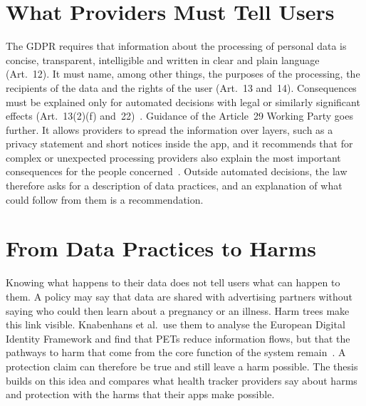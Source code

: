 \section{What Providers Must Tell Users}
\label{sec:transparency}
The GDPR requires that information about the processing of personal data is
concise, transparent, intelligible and written in clear and plain language
(Art.~12). It must name, among other things, the purposes of the processing,
the recipients of the data and the rights of the user (Art.~13 and~14).
Consequences must be explained only for automated decisions with legal or
similarly significant effects (Art.~13(2)(f) and~22)~\parencite{gdpr2016}.
Guidance of the Article~29 Working Party goes further. It allows providers to
spread the information over layers, such as a privacy statement and short
notices inside the app, and it recommends that for complex or unexpected
processing providers also explain the most important consequences for the
people concerned~\parencite[paras.~10, 35, 39]{wp292018transparency}. Outside
automated decisions, the law therefore asks for a description of data
practices, and an explanation of what could follow from them is a
recommendation.

\section{From Data Practices to Harms}
\label{sec:practices-harms}
Knowing what happens to their data does not tell users what can happen to
them. A policy may say that data are shared with advertising partners without
saying who could then learn about a pregnancy or an illness. Harm trees make
this link visible. Knabenhans et al.\ use them to analyse the European Digital
Identity Framework and find that PETs reduce information flows, but that the
pathways to harm that come from the core function of the system
remain~\parencite{knabenhans2026harms}. A protection claim can therefore be
true and still leave a harm possible. The thesis builds on this idea and compares
what health tracker providers say about harms and protection with the harms
that their apps make possible.
